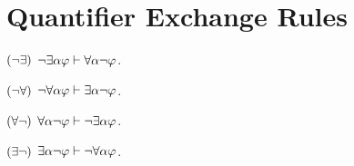 \documentclass[a4paper, 11pt]{article} %
\begin{document}
\begin{enumerate}
\end{enumerate}

\section*{Quantifier Exchange Rules}

\begin{enumerate}
  \begin{multicols}{2}
    \item[$(\neg\exists)$] $\neg\exists \alpha\varphi \vdash \forall \alpha\neg\varphi$.
    \item[$(\neg\forall)$] $\neg\forall \alpha\varphi \vdash \exists \alpha\neg\varphi$.
    \item[$(\forall\neg)$] $\forall \alpha\neg\varphi \vdash \neg\exists \alpha\varphi$.
    \item[$(\exists\neg)$] $\exists \alpha\neg\varphi \vdash \neg\forall \alpha\varphi$.
  \end{multicols}
\end{enumerate}
\end{document}
